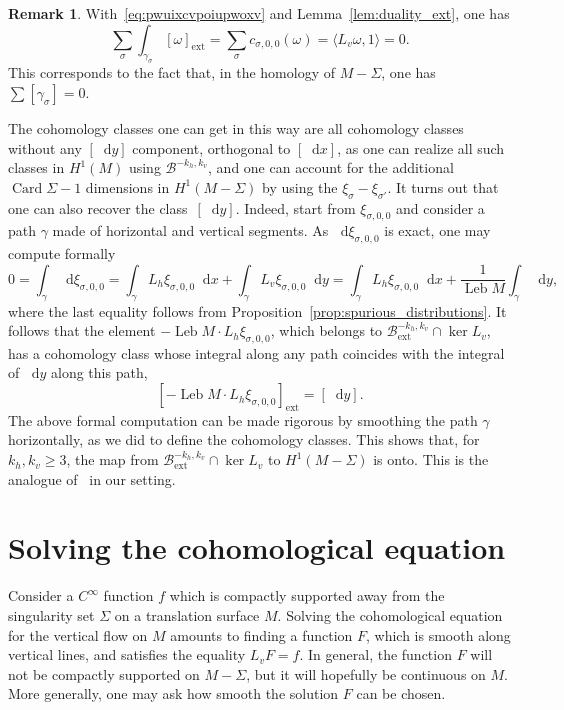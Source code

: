 \documentclass[JEP,XML,SOM,Unicode]{cedram}
\newcommand{\ext}{\mathrm{ext}}
\newcommand{\boB}{\mathcal{B}}
\newcommand{\dd}{\mathop{}\!\mathrm{d}}
\DeclareMathOperator{\Card}{Card}
\DeclareMathOperator{\Leb}{Leb}
\theoremstyle{definition}
\newtheorem{rmk}[thm]{Remark}
\numberwithin{equation}{section}
\begin{document}
\begin{rmk}
With~\eqref{eq:pwuixcvpoiupwoxv} and Lemma~\ref{lem:duality_ext}, one has
\begin{equation*}
\sum_{\sigma} \int_{\gamma_\sigma} [\omega]_{\ext}
= \sum_{\sigma} c_{\sigma, 0, 0}(\omega) =
\langle L_v \omega, 1 \rangle
= 0.
\end{equation*}
This corresponds to the fact that, in the homology of $M-\Sigma$, one has
$\sum [\gamma_\sigma] = 0$.

The cohomology classes one can get in this way are all cohomology classes
without any $[\dd y]$ component, \ie orthogonal to $[\dd x]$, as one can
realize all such classes in $H^1(M)$ using $\boB^{-k_h, k_v}$, and one can
account for the additional $\Card \Sigma - 1$ dimensions in $H^1(M-\Sigma)$
by using the $\xi_\sigma - \xi_{\sigma'}$. It turns out that one can also
recover the class~$[\dd y]$. Indeed, start from $\xi_{\sigma, 0, 0}$ and
consider a path $\gamma$ made of horizontal and vertical segments. As $\dd
\xi_{\sigma,0, 0}$ is exact, one may compute formally
\begin{equation*}
0 = \int_\gamma \dd \xi_{\sigma,0, 0}
= \int_\gamma L_h \xi_{\sigma, 0,0} \dd x + \int_{\gamma} L_v \xi_{\sigma, 0, 0} \dd y
= \int_\gamma L_h \xi_{\sigma, 0,0} \dd x + \frac{1}{\Leb M} \int_{\gamma} \dd y,
\end{equation*}
where the last equality follows from
Proposition~\ref{prop:spurious_distributions}. It follows that the element
$-\Leb M \cdot L_h \xi_{\sigma, 0,0}$, which belongs to $\boB^{-k_h,
k_v}_{\ext} \cap \ker L_v$, has a cohomology class whose integral along any
path coincides with the integral of $\dd y$ along this path, \ie
\[
[-\Leb M
\cdot L_h \xi_{\sigma, 0,0}]_{\ext} = [\dd y].
\]
The above formal computation
can be made rigorous by smoothing the path $\gamma$ horizontally, as we did
to define the cohomology classes. This shows that, for $k_h, k_v \geq 3$, the
map from $\boB^{-k_h, k_v}_{\ext} \cap \ker L_v$ to $H^1(M-\Sigma)$ is onto.
This is the analogue of~\cite[Th.\,7.1(ii)]{forni_deviation} in our
setting.
\end{rmk}

\section{Solving the cohomological equation}
\label{sec:cohomological}

Consider a $C^\infty$ function $f$ which is compactly supported away from the
singularity set $\Sigma$ on a translation surface $M$. Solving the
cohomological equation for the vertical flow on $M$ amounts to finding a
function $F$, which is smooth along vertical lines, and satisfies the
equality $L_v F = f$. In general, the function $F$ will not be compactly
supported on $M-\Sigma$, but it will hopefully be continuous on $M$. More
generally, one may ask how smooth the solution $F$ can be chosen.
\end{document}
